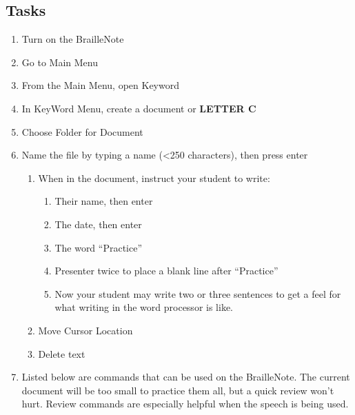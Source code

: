 \documentclass[10pt,letterpaper,twoside]{report}
\begin{document}
{{{\subsection{Tasks}
\begin{enumerate}
	\item Turn on the BrailleNote 
	\item Go to Main Menu 
	\item From the Main Menu, open Keyword  
	\item In KeyWord Menu, create a document  or {\textcolor{accent}{\MakeUppercase{\textbf{letter c}}}}
	\item Choose Folder for Document 
	\item Name the file by typing a name (<250 characters), then press enter
	\begin{enumerate}
    	\item When in the document, instruct your student to write:
    	    \begin{enumerate} 
    	    \item Their name, then enter
    	    \item The date, then enter
    	    \item The word ``Practice'' 
    	    \item Presenter twice to place a blank line after ``Practice''
    	    \item Now your student may write two or three sentences to get a feel for what writing in the word processor is like.
    	    \end{enumerate}
    	\item Move Cursor Location  
    	\item Delete text  
	\end{enumerate}
	\item Listed below are commands that can be used on the BrailleNote.  The current document will be too small to practice them all, but a quick review won't hurt.  Review commands are especially helpful when the speech is being used.
	      \begin{enumerate}

\end{enumerate}
\end{enumerate}}}}
\end{document}

